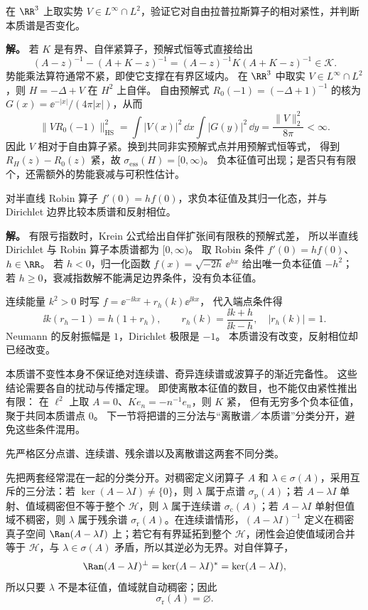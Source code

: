 \begin{example}[短程乘法势的相对紧性]
在 $\RR^3$ 上取实势 $V\in L^\infty\cap L^2$，验证它对自由拉普拉斯算子的相对紧性，并判断本质谱是否变化。

\textbf{解。} 若 $K$ 是有界、自伴紧算子，预解式恒等式直接给出
\[
(A-z)^{-1}-(A+K-z)^{-1}
=(A-z)^{-1}K(A+K-z)^{-1}\in\mathcal K.
\]
势能乘法算符通常不紧，即使它支撑在有界区域内。
在 $\RR^3$ 中取实 $V\in L^\infty\cap L^2$，则 $H=-\Delta+V$ 在 $H^2$ 上自伴。
自由预解式 $R_0(-1)=(-\Delta+1)^{-1}$ 的核为
$G(x)=\ee^{-|x|}/(4\pi|x|)$，从而
\[
\|VR_0(-1)\|_{\mathrm{HS}}^2
=\int|V(x)|^2\,\dd x\int|G(y)|^2\,\dd y
=\frac{\|V\|_2^2}{8\pi}<\infty.
\]
因此 $V$ 相对于自由算子紧。换到共同非实预解式点并用预解式恒等式，
得到 $R_H(z)-R_0(z)$ 紧，故 $\sigma_{\mathrm{ess}}(H)=[0,\infty)$。
负本征值可出现；是否只有有限个，还需额外的势能衰减与可积性估计。
\end{example}

\begin{example}
对半直线 Robin 算子 $f\prime(0)=hf(0)$，求负本征值及其归一化态，并与 Dirichlet 边界比较本质谱和反射相位。

\textbf{解。} 有限亏指数时，Krein 公式给出自伴扩张间有限秩的预解式差，
所以半直线 Dirichlet 与 Robin 算子本质谱都为 $[0,\infty)$。
取 Robin 条件 $f'(0)=h f(0)$、$h\in\RR$。
若 $h<0$，归一化函数 $f(x)=\sqrt{-2h}\,\ee^{hx}$ 给出唯一负本征值 $-h^2$；
若 $h\ge0$，衰减指数解不能满足边界条件，没有负本征值。

连续能量 $k^2>0$ 时写 $f=\ee^{-\ii kx}+r_h(k)\ee^{\ii kx}$，
代入端点条件得
\[
\ii k(r_h-1)=h(1+r_h),\qquad
r_h(k)=\frac{\ii k+h}{\ii k-h},\quad |r_h(k)|=1.
\]
Neumann 的反射振幅是 $1$，Dirichlet 极限是 $-1$。
本质谱没有改变，反射相位却已经改变。
\end{example}

\begin{note}[本质谱不变不等于散射理论不变]
本质谱不变性本身不保证绝对连续谱、奇异连续谱或波算子的渐近完备性。
这些结论需要各自的扰动与传播定理。
即使离散本征值的数目，也不能仅由紧性推出有限：
在 $\ell^2$ 上取 $A=0$、$Ke_n=-n^{-1}e_n$，则 $K$ 紧，
但有无穷多个负本征值，聚于共同本质谱点 $0$。
下一节将把谱的三分法与“离散谱／本质谱”分类分开，避免这些条件混用。
\end{note}

先严格区分点谱、连续谱、残余谱以及离散谱这两套不同分类。

先把两套经常混在一起的分类分开。对稠密定义闭算子 $A$ 和 $\lambda\in\sigma(A)$，采用互斥的三分法：若
$\ker(A-\lambda I)\neq\{0\}$，则 $\lambda$ 属于点谱 $\sigma_{\mathrm p}(A)$；若
$A-\lambda I$ 单射、值域稠密但不等于整个 $\mathcal H$，则 $\lambda$ 属于连续谱 $\sigma_{\mathrm c}(A)$；若
$A-\lambda I$ 单射但值域不稠密，则 $\lambda$ 属于残余谱 $\sigma_{\mathrm r}(A)$。在连续谱情形，$(A-\lambda I)^{-1}$ 定义在稠密真子空间 $\Ran(A-\lambda I)$ 上；若它有有界延拓到整个 $\mathcal H$，闭性会迫使值域闭合并等于 $\mathcal H$，与 $\lambda\in\sigma(A)$ 矛盾，所以其逆必为无界。对自伴算子，
\[
 \Ran(A-\lambda I)^\perp
 =\ker(A-\lambda I)^*=
 \ker(A-\lambda I),
\]
所以只要 $\lambda$ 不是本征值，值域就自动稠密；因此
\begin{equation*}\sigma_{\mathrm r}(A)=\varnothing.
\end{equation*}

